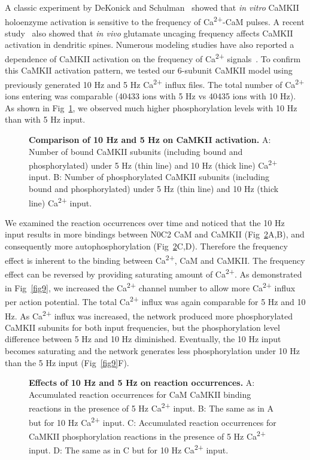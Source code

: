 \documentclass[10pt,letterpaper]{article}
\begin{document}
A classic experiment by DeKonick and Schulman~\cite{DeKoninck:1998wh} showed that \textit{in vitro} CaMKII holoenzyme activation is sensitive to the frequency of Ca\textsuperscript{2+}-CaM pulses. A recent study~\cite{Fujii:2013bg} also showed that \textit{in vivo} glutamate uncaging frequency affects CaMKII activation in dendritic spines. Numerous modeling studies have also reported a dependence of CaMKII activation on the frequency of Ca\textsuperscript{2+} signals~\cite{Pepke:2010ju,Dupont:2003vq,Michalski:2012ds,Kubota:2001ul}. To confirm this CaMKII activation pattern, we tested our 6-subunit CaMKII model using previously generated 10 Hz and 5 Hz Ca\textsuperscript{2+} influx files. The total number of Ca\textsuperscript{2+} ions entering was comparable (40433 ions with 5 Hz vs 40435 ions with 10 Hz). As shown in Fig~\ref{fig7}, we observed much higher phosphorylation levels with 10 Hz than with 5 Hz input.

\begin{figure}[!h]
	\caption{{\bf Comparison of 10 Hz and 5 Hz on CaMKII activation.}
	A: Number of bound CaMKII subunits (including bound and phosphorylated) under 5 Hz (thin line) and 10 Hz (thick line) Ca\textsuperscript{2+} input.
	B: Number of phosphorylated CaMKII subunits (including bound and phosphorylated) under 5 Hz (thin line) and 10 Hz (thick line) Ca\textsuperscript{2+} input.
	}
\label{fig7}
\end{figure}

We examined the reaction occurrences over time and noticed that the 10 Hz input results in more bindings between N0C2 CaM and CaMKII (Fig~\ref{fig8}A,B), and consequently more autophosphorylation (Fig~\ref{fig8}C,D). Therefore the frequency effect is inherent to the binding between Ca\textsuperscript{2+}, CaM and CaMKII. The frequency effect can be reversed by providing saturating amount of Ca\textsuperscript{2+}. As demonstrated in Fig~\ref{fig9}, we increased the Ca\textsuperscript{2+} channel number to allow more Ca\textsuperscript{2+} influx per action potential. The total Ca\textsuperscript{2+} influx was again comparable for 5 Hz and 10 Hz. As Ca\textsuperscript{2+} influx was increased, the network produced more phosphorylated CaMKII subunits for both input frequencies, but the phosphorylation level difference between 5 Hz and 10 Hz diminished. Eventually, the 10 Hz input becomes saturating and the network generates less phosphorylation under 10 Hz than the 5 Hz input (Fig~\ref{fig9}F).
\begin{figure}[!h]
	\caption{{\bf Effects of 10 Hz and 5 Hz on reaction occurrences.} 
	A: Accumulated reaction occurrences for CaM CaMKII binding reactions in the presence of 5 Hz Ca\textsuperscript{2+} input. 
	B: The same as in A but for 10 Hz Ca\textsuperscript{2+} input.
	C: Accumulated reaction occurrences for CaMKII phosphorylation reactions in the presence of 5 Hz Ca\textsuperscript{2+} input. 
	D: The same as in C but for 10 Hz Ca\textsuperscript{2+} input.
	}
\label{fig8}
\end{figure}
\end{document}
